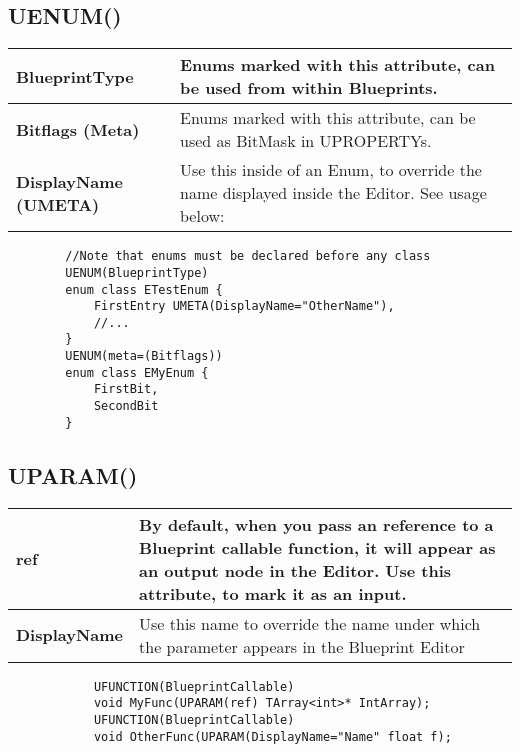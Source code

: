 \documentclass[10pt,a4paper]{article}
\begin{document}
\begin{multicols*}{2}
	
	\subsection{UENUM()}
	
	\begin{tabularx}{\columnwidth}{|l|X|}
		\hline \textbf{BlueprintType}
		& Enums marked with this attribute, can be used from within Blueprints. \\
		\hline \textbf{Bitflags (Meta)}
		& Enums marked with this attribute, can be used as BitMask in UPROPERTYs. \\
		\hline \textbf{DisplayName (UMETA)}
		& Use this inside of an Enum, to override the name displayed inside the Editor. See usage below: \\
		\hline
	\end{tabularx}
	
	\begin{minipage}{\columnwidth}
	\begin{verbatim}
		//Note that enums must be declared before any class
		UENUM(BlueprintType)
		enum class ETestEnum {
		    FirstEntry UMETA(DisplayName="OtherName"), 
		    //...
		}
		UENUM(meta=(Bitflags))
		enum class EMyEnum {
			FirstBit,
			SecondBit
		}
	\end{verbatim} 
	\end{minipage}

	\subsection{UPARAM()}
	\begin{tabularx}{\columnwidth}{|l|X|}
			\hline \textbf{ref}
			& By default, when you pass an reference to a Blueprint callable function, it will appear as an output node in the Editor. Use this attribute, to mark it as an input.\\
			\hline \textbf{DisplayName}
			& Use this name to override the name under which the parameter appears in the Blueprint Editor \\
			\hline
	\end{tabularx}
	
	\begin{minipage}{\columnwidth}
		\begin{verbatim}
			UFUNCTION(BlueprintCallable)
			void MyFunc(UPARAM(ref) TArray<int>* IntArray);
			UFUNCTION(BlueprintCallable)
			void OtherFunc(UPARAM(DisplayName="Name" float f);
		\end{verbatim}
	\end{minipage}
	

\end{multicols*}
\end{document}
